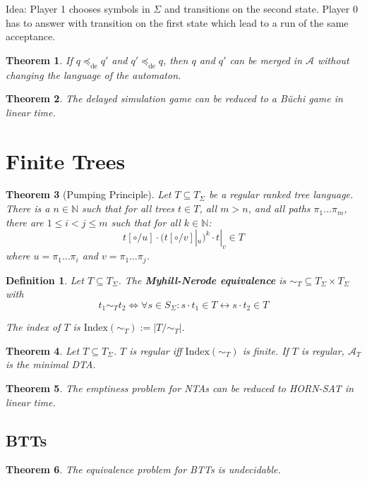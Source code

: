 \documentclass{article}
\newtheorem{theorem}{Theorem}[section]
\newtheorem{definition}{Definition}
\begin{document}
Idea: Player 1 chooses symbols in $\Sigma$ and transitions on the second state. Player 0 has to answer with transition on the first state which lead to a run of the same acceptance.

\begin{theorem}
	If $q \preceq_\text{de} q'$ and $q' \preceq_\text{de} q$, then $q$ and $q'$ can be merged in $\mathcal{A}$ without changing the language of the automaton.
\end{theorem}

\begin{theorem}
	The delayed simulation game can be reduced to a Büchi game in linear time.
\end{theorem}
 

\section{Finite Trees}
\begin{theorem}[Pumping Principle]
	Let $T \subseteq T_\Sigma$ be a regular ranked tree language. There is a $n \in \mathbb{N}$ such that for all trees $t \in T$, all $m > n$, and all paths $\pi_1 \dots \pi_m$, there are $1 \leq i < j \leq m$ such that for all $k \in \mathbb{N}$:
	$$t[\circ / u] \cdot (t[\circ/v]|_u)^k \cdot t|_v \in T$$
	where $u = \pi_1 \dots \pi_i$ and $v = \pi_1 \dots \pi_j$.
\end{theorem}

\begin{definition}
	Let $T \subseteq T_\Sigma$. The \textbf{Myhill-Nerode equivalence} is $\sim_T \subseteq T_\Sigma \times T_\Sigma$ with 
	$$t_1 \sim_T t_2 \Leftrightarrow \forall s \in S_\Sigma: s \cdot t_1 \in T \leftrightarrow s \cdot t_2 \in T$$
	
	The index of $T$ is $\text{Index}(\sim_T) := |T/\sim_T|$.
\end{definition}

\begin{theorem}
	Let $T \subseteq T_\Sigma$. $T$ is regular iff $\text{Index}(\sim_T)$ is finite. If $T$ is regular, $\mathcal{A}_T$ is the minimal DTA.
\end{theorem}

\begin{theorem}
	The emptiness problem for NTAs can be reduced to \textsf{HORN-SAT} in linear time.
\end{theorem}

\subsection{BTTs}
\begin{theorem}
	The equivalence problem for BTTs is undecidable.
\end{theorem}
\end{document}
